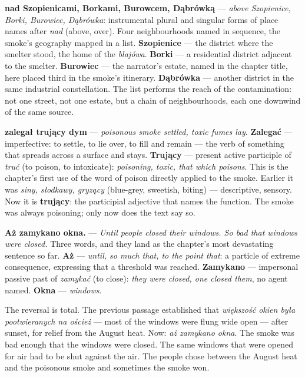 \textbf{nad Szopienicami, Borkami, Burowcem, Dąbrówką}
--- \textit{above Szopienice, Borki, Burowiec,
Dąbrówka}: instrumental plural and singular forms of
place names after \textit{nad} (above, over).
Four neighbourhoods named in sequence, the smoke's
geography mapped in a list. \textbf{Szopienice} ---
the district where the smelter stood, the home of
the \textit{blajówa}. \textbf{Borki} --- a residential
district adjacent to the smelter. \textbf{Burowiec}
--- the narrator's estate, named in the chapter title,
here placed third in the smoke's itinerary.
\textbf{Dąbrówka} --- another district in the same
industrial constellation. The list performs the reach
of the contamination: not one street, not one estate,
but a chain of neighbourhoods, each one downwind of
the same source.

\textbf{zalegał trujący dym} --- \textit{poisonous
smoke settled, toxic fumes lay}. \textbf{Zalegać}
--- imperfective: to settle, to lie over, to fill
and remain --- the verb of something that spreads
across a surface and stays. \textbf{Trujący} ---
present active participle of \textit{truć} (to
poison, to intoxicate): \textit{poisoning, toxic,
that which poisons}. This is the chapter's first
use of the word of poison directly applied to the
smoke. Earlier it was \textit{siny, słodkawy,
gryzący} (blue-grey, sweetish, biting) ---
descriptive, sensory. Now it is \textbf{trujący}:
the participial adjective that names the function.
The smoke was always poisoning; only now does the
text say so.

\medskip

\textbf{Aż zamykano okna.} --- \textit{Until people
closed their windows. So bad that windows were
closed.} Three words, and they land as the
chapter's most devastating sentence so far.
\textbf{Aż} --- \textit{until, so much that,
to the point that}: a particle of extreme
consequence, expressing that a threshold was
reached. \textbf{Zamykano} --- impersonal passive
past of \textit{zamykać} (to close): \textit{they
were closed, one closed them}, no agent named.
\textbf{Okna} --- \textit{windows}.

The reversal is total. The previous passage
established that \textit{większość okien była
pootwieranych na oścież} --- most of the windows
were flung wide open --- after sunset, for relief
from the August heat. Now: \textit{aż zamykano
okna}. The smoke was bad enough that the windows
were closed. The same windows that were opened
for air had to be shut against the air. The
people chose between the August heat and the
poisonous smoke and sometimes the smoke won.

